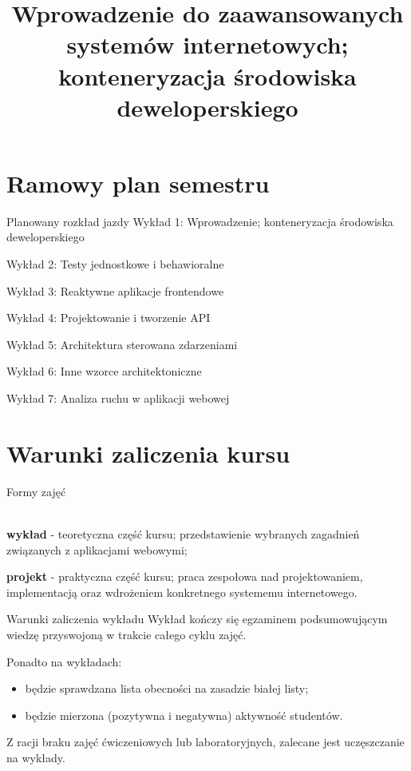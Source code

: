 

\title{Wprowadzenie do zaawansowanych systemów internetowych; konteneryzacja środowiska deweloperskiego}



\section{Ramowy plan semestru}

\begin{frame}{Planowany rozkład jazdy}
	Wykład 1: Wprowadzenie; konteneryzacja środowiska deweloperskiego
	
	Wykład 2: Testy jednostkowe i behawioralne
	
	Wykład 3: Reaktywne aplikacje frontendowe
	
	Wykład 4: Projektowanie i tworzenie API
	
	Wykład 5: Architektura sterowana zdarzeniami
	
	Wykład 6: Inne wzorce architektoniczne
	
	Wykład 7: Analiza ruchu w aplikacji webowej
\end{frame}

\section{Warunki zaliczenia kursu}

\begin{frame}{Formy zajęć}
	\begin{figure}
	\end{figure}
	
	\ \\
	
	\textbf{wykład} - teoretyczna część kursu; przedstawienie wybranych zagadnień związanych z aplikacjami webowymi;
	
	\textbf{projekt} - praktyczna część kursu; praca zespołowa nad projektowaniem, implementacją oraz wdrożeniem konkretnego systememu internetowego.
\end{frame}

\begin{frame}{Warunki zaliczenia wykładu}
	Wykład kończy się egzaminem podsumowującym wiedzę przyswojoną w trakcie całego cyklu zajęć. 
	
	Ponadto na wykładach:
	\begin{itemize}
		\item będzie sprawdzana lista obecności na zasadzie białej listy;
		\item będzie mierzona (pozytywna i negatywna) aktywność studentów.
	\end{itemize}
	
	Z racji braku zajęć ćwiczeniowych lub laboratoryjnych, zalecane jest uczęszczanie na wykłady.
\end{frame}

